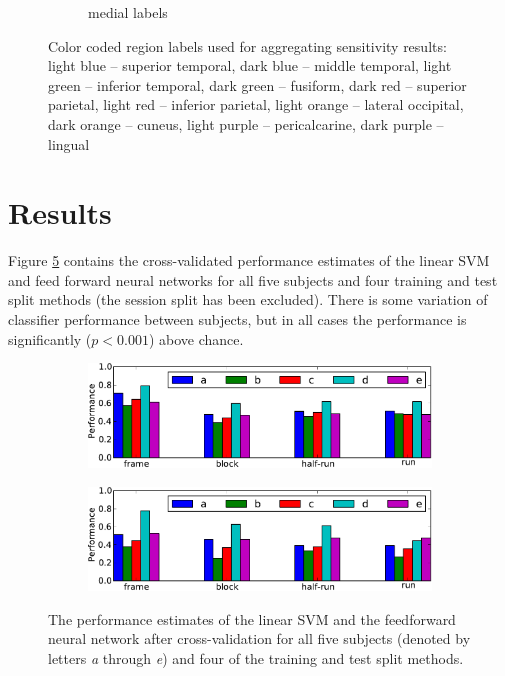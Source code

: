 \documentclass{article}
\begin{document}
\begin{figure}
\begin{subfigure}{0.4\textwidth}
\caption{medial labels}
\label{fig:medial-labels}
\end{subfigure}
\caption{Color coded region labels used for aggregating sensitivity results: light blue -- superior temporal, dark blue -- middle temporal, light green -- inferior temporal, dark green -- fusiform, dark red -- superior parietal, light red -- inferior parietal, light orange -- lateral occipital, dark orange -- cuneus, light purple -- pericalcarine, dark purple -- lingual}
\label{fig:labels}
\end{figure}

\section{Results}
Figure \ref{fig:performance-graph} contains the cross-validated
performance estimates of the linear SVM and feed forward neural networks for all five subjects and four training and test split methods (the session split has been excluded).
There is some variation of classifier performance between subjects, but in all cases the performance is significantly ($p < 0.001$) above chance. 

\begin{figure}
\centering
\begin{subfigure}{0.8\textwidth}
\centering
\includegraphics[width=\textwidth]{figures/svm-performance-graph}
\caption{}
\label{fig:svm-performance-graph}
\end{subfigure}
\begin{subfigure}{0.8\textwidth}
\centering
\includegraphics[width=\textwidth]{figures/nn-performance-graph}
\caption{}
\label{fig:nn-performance-graph}
\end{subfigure}
\caption{The performance estimates of the  linear SVM and the  feedforward neural network after cross-validation for all five subjects (denoted by letters \emph{a} through \emph{e}) and four of the training and test split methods. }
\label{fig:performance-graph}
\end{figure}
\end{document}
